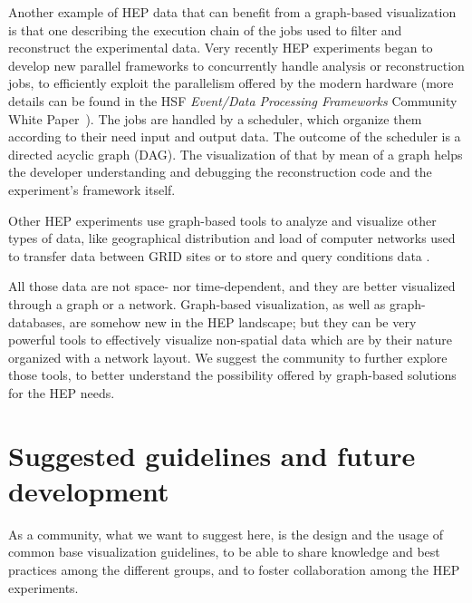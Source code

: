 \documentclass[12pt,a4paper]{article}
\begin{document}
Another example of HEP data that can benefit from a graph-based visualization is that one describing the execution chain of the jobs
used to filter and reconstruct the experimental data. Very recently HEP experiments began to develop new parallel frameworks
to concurrently handle analysis or reconstruction jobs, to efficiently exploit the parallelism offered by the modern hardware (more details can be found in the HSF \textit{Event/Data Processing Frameworks} Community White Paper~\cite{HSF-CWP-2017-08}).
The jobs are handled by a scheduler, which organize them according to their need input and output data. The outcome of the scheduler
is a directed acyclic graph (DAG). The visualization of that by mean of a graph helps the developer understanding and debugging the
reconstruction code and the experiment’s framework itself.

Other HEP experiments use graph-based tools to analyze and visualize other types of data, like geographical distribution and load of computer networks used to transfer data between GRID sites \cite{???} %
 or to store and query conditions data \cite{Clemencic:2012cw}.


All those data are not space- nor time-dependent, and they are better visualized through a graph or a network. Graph-based visualization,
as well as graph-databases, are somehow new in the HEP landscape; but they can be very powerful tools to effectively visualize
non-spatial data which are by their nature organized with a network layout. We suggest the community to further explore those tools, to better understand the possibility offered by graph-based solutions for the HEP needs.





\hypertarget{suggested-guidelines}{%
\section{Suggested guidelines and future development}\label{suggested-guidelines}}

As a community, what we want to suggest here, is the design and the usage of common base visualization guidelines, to be able to share knowledge and best practices among the different groups, and to foster collaboration among the HEP experiments.
\end{document}
